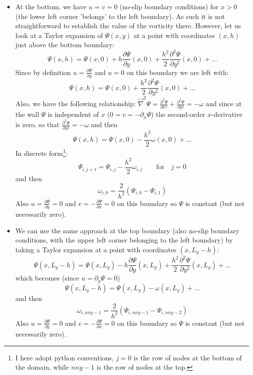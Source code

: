 \begin{itemize}
\item At the bottom, we have $u=v=0$ (no-slip boundary conditions) for $x>0$ (the lower left corner 'belongs' to the left boundary).
As such it is not straightforward to establish the value of the vorticity there. 
However, let us look at a Taylor expansion of $\Psi(x,y)$ at a point with coordinates $(x,h)$ just above 
the bottom boundary:
\[
\Psi(x,h) = \Psi(x,0) + h \frac{\partial \Psi}{\partial y}(x,0)  
+ \frac{h^2}{2}  \frac{\partial^2 \Psi}{\partial y^2} (x,0) + ...
\]
Since by definition $u=\frac{\partial \Psi}{\partial y}$ and $u=0$ on this boundary we are left with:
\[
\Psi(x,h) = \Psi(x,0) + \frac{h^2}{2}  \frac{\partial^2 \Psi}{\partial y^2}(x,0) + ...
\]
Also, we have the following relationship:
$
\vec\nabla^2 \Psi=
\frac{\partial^2 \Psi}{\partial x^2 }
+\frac{\partial^2 \Psi}{\partial y^2 } = -\omega
$ and since at the wall $\Psi$ is independent of $x$ ($0=v=-\partial_x \Psi$) the second-order $x$-derivative is zero, so that $\frac{\partial^2 \Psi}{\partial y^2 } = -\omega$ and then
\[
\Psi(x,h) = \Psi(x,0) - \frac{h^2}{2}  \omega(x,0) + ...
\]
In discrete form\footnote{I here adopt python conventions, $j=0$ is the row of nodes at the 
bottom of the domain, while $nny-1$ is the row of nodes at the top.}:
\[
\Psi_{i,j+1} = \Psi_{i,j} - \frac{h^2}{2} \omega_{i,j} \qquad \text{for} \quad  j=0
\]
and then
\begin{equation}
\omega_{i,0} = \frac{2}{h^2} (\Psi_{i,0} -\Psi_{i,1} )  
\label{eq:omega3}
\end{equation}
Also $u=\frac{\partial \Psi}{\partial y}=0$ and $v=-\frac{\partial \Psi}{\partial x}=0$ on this boundary so $\Psi$ is constant (but not necessarily zero). 



\item We can use the same approach at the top boundary (also no-slip boundary conditions, with the upper left corner belonging to the left boundary) by taking a Taylor expansion at a point with coordinates $(x,L_y-h)$:
\[
\Psi(x,L_y-h) = \Psi(x,L_y) - h \frac{\partial \Psi}{\partial y}(x,L_y)  
+ \frac{h^2}{2}  \frac{\partial^2 \Psi}{\partial y^2} (x,L_y) + ...
\]
which becomes (since $u=\partial_y \Psi=0$)
\[
\Psi(x,L_y-h) = \Psi(x,L_y) 
-\omega (x,L_y) + ...
\]
and then
\begin{equation}
\omega_{i,nny-1} = \frac{2}{h^2} (\Psi_{i,nny-1} -\Psi_{i,nny-2} )  
\label{eq:omega4}
\end{equation}
Also $u=\frac{\partial \Psi}{\partial y}=0$ and $v=-\frac{\partial \Psi}{\partial x}=0$ on this boundary so $\Psi$ is constant (but not necessarily zero). 

\end{itemize}


